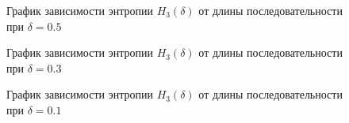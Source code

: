 \documentclass[a4paper,12pt]{article}
\theoremstyle{plain}
\begin{document}
	\begin{figure}[h]
		\caption{График зависимости энтропии $H_3{(\delta)}$ от длины последовательности при  $\delta = 0.5$}
		\label{ris:"h3_05.png"}
	\end{figure}
	\begin{figure}[h]
		\caption{График зависимости энтропии $H_3{(\delta)}$ от длины последовательности при  $\delta = 0.3$}
		\label{ris:"h3_03.png"}
	\end{figure}
		\begin{figure}[h]
			\caption{График зависимости энтропии $H_3{(\delta)}$ от длины последовательности при  $\delta = 0.1$}
			\label{ris:"h3_01.png"}
		\end{figure}
\end{document}
